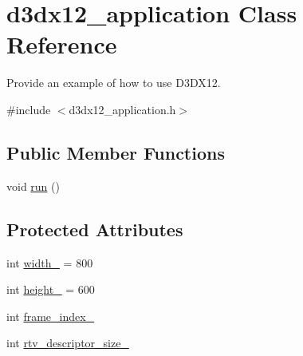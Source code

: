 \hypertarget{classd3dx12__application}{}\section{d3dx12\+\_\+application Class Reference}
\label{classd3dx12__application}


Provide an example of how to use D3\+D\+X12.  




{\ttfamily \#include $<$d3dx12\+\_\+application.\+h$>$}

\subsection*{Public Member Functions}
\begin{DoxyCompactItemize}
\item 
void \mbox{\hyperlink{classd3dx12__application_a0d4d4dfd3706acb56a506c5372c05042}{run}} ()
\end{DoxyCompactItemize}
\subsection*{Protected Attributes}
\begin{DoxyCompactItemize}
\item 
int \mbox{\hyperlink{classd3dx12__application_ae3510bf48db929de749956b6d7997a4a}{width\+\_\+}} = 800
\item 
int \mbox{\hyperlink{classd3dx12__application_a3bdbeb95fd1d97f8478e06acad151967}{height\+\_\+}} = 600
\item 
int \mbox{\hyperlink{classd3dx12__application_aaf766368abb157a0063084ad8dc38c03}{frame\+\_\+index\+\_\+}}
\item 
int \mbox{\hyperlink{classd3dx12__application_aaee210e2d0e3edf82a7c6fea4614291a}{rtv\+\_\+descriptor\+\_\+size\+\_\+}}
\end{DoxyCompactItemize}
